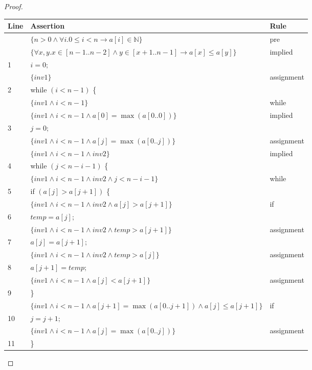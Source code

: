 \documentclass{article}
\begin{document}
\begin{proof}
\noindent\begin{tabular}{lll}
\hline
{Line} & {Assertion} & {Rule} \\ \hline
& $\{n > 0 \land \forall i. 0 \le i < n \to a[i] \in \mathbb{N}\}$ & pre \\ \hline
& $\{\forall x, y. x \in [n - 1 .. n - 2] \land y \in [x + 1 .. n - 1] \to a[x] \le a[y]\}$ & implied \\ \hline
1 & $i = 0;$ & \\ \hline
& $\{inv1\}$ & assignment \\ \hline
2 & {while} $(i < n - 1)$ \{ & \\ \hline
& $\{inv1 \land i < n - 1\}$ & while \\ \hline
& $\{inv1 \land i < n - 1 \land a[0] = \max(a[0 .. 0])\}$ & implied \\ \hline
3 & $j = 0;$ & \\ \hline
& $\{inv1 \land i < n - 1 \land a[j] = \max(a[0 .. j])\}$ & assignment \\ \hline
& $\{inv1 \land i < n - 1 \land inv2\}$ & implied \\ \hline
4 & {while} $(j < n - i - 1)$ \{ & \\ \hline
& $\{inv1 \land i < n - 1 \land inv2 \land j < n - i - 1\}$ & while \\ \hline
5 & {if} $(a[j] > a[j + 1])$ \{ & \\ \hline
& $\{inv1 \land i < n - 1 \land inv2 \land a[j] > a[j + 1]\}$ & if \\ \hline
6 & $temp = a[j];$ & \\ \hline
& $\{inv1 \land i < n - 1 \land inv2 \land temp > a[j + 1]\}$ & assignment \\ \hline
7 & $a[j] = a[j + 1];$ & \\ \hline
& $\{inv1 \land i < n - 1 \land inv2 \land temp > a[j]\}$ & assignment \\ \hline
8 & $a[j + 1] = temp;$ & \\ \hline
& $\{inv1 \land i < n - 1 \land a[j] < a[j + 1]\}$ & assignment \\ \hline
9 & \} & \\ \hline
& $\{inv1 \land i < n - 1 \land a[j + 1] = \max(a[0 .. j + 1]) \land a[j] \le a[j + 1]\}$ & if \\ \hline
10 & $j = j + 1;$ & \\ \hline
& $\{inv1 \land i < n - 1 \land a[j] = \max(a[0 .. j])\}$ & assignment \\ \hline
11 & \} & \\ \hline

\end{tabular}
\end{proof}
\end{document}

